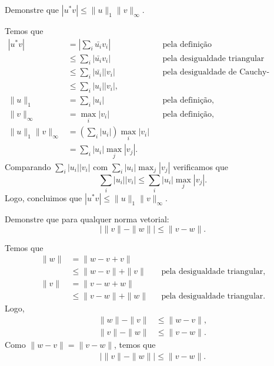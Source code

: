 \begin{questions}
    \question Demonstre que $| u^* v | \leq \| u \|_1 \| v \|_\infty$.
    \begin{solution}
        Temos que
        \begin{align*}
            \left| u^* v \right| &= \left| \sum_i \bar{u_i} v_i \right| && \text{pela defini\c{c}\~{a}o} \\
            &\leq \sum_i \left| \bar{u_i} v_i \right| && \text{pela desigualdade triangular} \\
            &\leq \sum_i \left| \bar{u_i} \right| \left| v_i \right| && \text{pela desigualdade de Cauchy-Schwarz} \\
            &\leq \sum_i \left| u_i \right| \left| v_i \right|, \\
            \| u \|_1 &= \sum_i | u_i | && \text{pela defini\c{c}\~{a}o,} \\
            \| v \|_\infty &= \max_i | v_i | && \text{pela defini\c{c}\~{a}o,} \\
            \| u \|_1 \| v \|_\infty &= \left( \sum_i | u_i | \right) \max_i | v_i | \\
            &= \sum_i | u_i | \max_j | v_j |.
        \end{align*}
        Comparando $\sum_i | u_i | | v_i |$ com $\sum_i | u_i | \max_j | v_j |$ verificamos que
        \[
        \sum_i | u_i | | v_i | \leq \sum_i | u_i | \max_j | v_j |.
        \]
        Logo, concluimos que $| u^* v | \leq \| u \|_1 \| v \|_\infty$.
    \end{solution}

    \question Demonstre que para qualquer norma vetorial:
    \[
    | \| v \| - \| w \| | \leq \| v - w \|.
    \]
    \begin{solution}
        Temos que
        \begin{align*}
            \| w \| &= \| w - v + v \| \\
            &\leq \| w - v \| + \| v \| && \text{pela desigualdade triangular,} \\
            \| v \| &= \| v - w + w \| \\
            &\leq \| v - w \| + \| w \| && \text{pela desigualdade triangular.}
        \end{align*}
        Logo,
        \begin{align*}
            \| w \| - \| v \| &\leq \| w - v \|, \\
            \| v \| - \| w \| &\leq \| v - w \|.
        \end{align*}
        Como $\| w - v \| = \| v - w \|$, temos que
        \begin{align*}
            | \| v \| - \| w \| | \leq \| v - w \|.
        \end{align*}
    \end{solution}


\end{questions}
